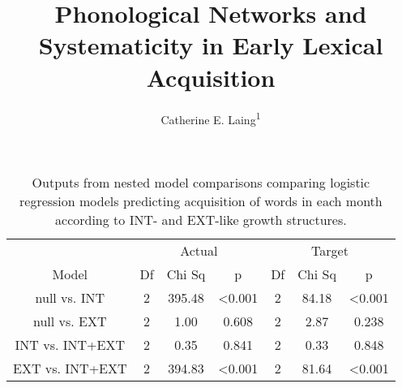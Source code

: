 \documentclass[
  man]{apa6}
\title{Phonological Networks and Systematicity in Early Lexical Acquisition}
\author{Catherine E. Laing\textsuperscript{1}}
\date{}
\affiliation{\vspace{0.5cm}\textsuperscript{1} University of York, York, UK}
\begin{document}
\maketitle

\begin{longtable}[t]{ccccccc}
\caption{\label{tab:table-model-outputs}Outputs from nested model comparisons comparing logistic regression models predicting acquisition of words in each month according to INT- and EXT-like growth structures.}\\
\toprule
\multicolumn{1}{c}{ } & \multicolumn{3}{c}{Actual} & \multicolumn{3}{c}{Target} \\
\cmidrule(l{3pt}r{3pt}){2-4} \cmidrule(l{3pt}r{3pt}){5-7}
Model & Df & Chi Sq & p & Df & Chi Sq & p\\
\midrule
null vs. INT & 2 & 395.48 & <0.001 & 2 & 84.18 & <0.001\\
null vs. EXT & 2 & 1.00 & 0.608 & 2 & 2.87 & 0.238\\
INT vs. INT+EXT & 2 & 0.35 & 0.841 & 2 & 0.33 & 0.848\\
EXT vs. INT+EXT & 2 & 394.83 & <0.001 & 2 & 81.64 & <0.001\\
\midrule
\bottomrule
\end{longtable}
\end{document}
